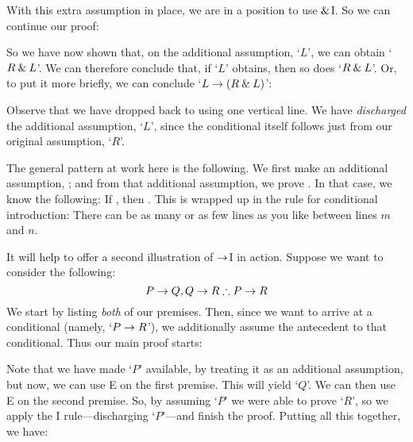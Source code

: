 With this extra assumption in place, we are in a position to use $\mathbin{\&}$I. So we can continue our proof:
	\begin{pf}
		\open
	\end{pf}
So we have now shown that, on the additional assumption, `$L$', we can obtain `$R \mathbin{\&} L$'. We can therefore conclude that, if `$L$' obtains, then so does `$R \mathbin{\&} L$'. Or, to put it more briefly, we can conclude `$L \rightarrow (R \mathbin{\&} L)$':
	\begin{pf}
		\hypo{r}{R}
		\open
			\hypo{l}{L}
			\ai{r, l}
			\close
		\ci{l-rl}
	\end{pf}
Observe that we have dropped back to using one vertical line.  We have \emph{discharged} the additional assumption, `$L$', since the conditional itself follows just from our original assumption, `$R$'.

The general pattern at work here is the following. We first make an additional assumption, \metaX; and from that additional assumption, we prove \metaY. In that case, we know the following: If \metaX, then \metaY. This is wrapped up in the rule for conditional introduction:
\factoidbox{
	\begin{pf}
	\open
		\hypo[m]{a}{\metaX}
		\ellipsesline
		\have[n]{b}{\metaY}
	\close
	\have[\ ]{ab}{\metaX\eif\metaY}\ci{a-b}
	\end{pf}}
There can be as many or as few lines as you like between lines $m$ and $n$. 

It will help to offer a second  illustration of $\rightarrow$I in action. Suppose we want to consider the following:
	$$P \eif Q, Q \eif R \therefore P \eif R$$
We start by listing \emph{both} of our premises. Then, since we want to arrive at a conditional (namely, `$P \rightarrow R$'), we additionally assume the antecedent to that conditional. Thus our main proof starts:
\begin{pf}
	\hypo{pq}{P \eif Q}
	\hypo{qr}{Q \eif R}
	\open
		\hypo{p}{P}
	\close
\end{pf}
Note that we have made `$P$' available, by treating it as an additional assumption, but now, we can use {\eif}E on the first premise. This will yield `$Q$'. We can then use {\eif}E on the second premise. So, by assuming `$P$' we were able to prove `$R$', so we apply the {\eif}I rule---discharging `$P$'---and finish the proof. Putting all this together, we have:
\label{HSproof}
\begin{pf}
	\open
		\ce{pq,p}
		\ce{qr,q}
	\close
\end{pf}

